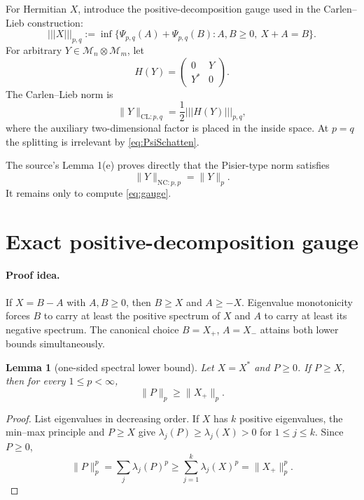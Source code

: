 \documentclass[11pt]{article}
\newtheorem{lemma}{Lemma}
\newcommand{\M}{\mathcal M}
\newcommand{\CL}{\mathrm{CL}}
\newcommand{\NC}{\mathrm{NC}}
\begin{document}
For Hermitian $X$, introduce the positive-decomposition gauge used in the
Carlen--Lieb construction:
\begin{equation}\label{eq:gauge}
 |||X|||_{p,q}:=
 \inf\{\Psi_{p,q}(A)+\Psi_{p,q}(B):
       A,B\ge0,\ X+A=B\}.
\end{equation}
For arbitrary $Y\in\M_n\otimes\M_m$, let
\[
 H(Y)=\begin{pmatrix}0&Y\\Y^*&0\end{pmatrix}.
\]
The Carlen--Lieb norm is
\begin{equation}\label{eq:CLdef}
 \|Y\|_{\CL:p,q}=\frac12|||H(Y)|||_{p,q},
\end{equation}
where the auxiliary two-dimensional factor is placed in the inside space.
At $p=q$ the splitting is irrelevant by \eqref{eq:PsiSchatten}.

The source's Lemma 1(e) proves directly that the Pisier-type norm satisfies
\begin{equation}\label{eq:NCsource}
 \|Y\|_{\NC:p,p}=\|Y\|_p.
\end{equation}
It remains only to compute \eqref{eq:gauge}.

\section{Exact positive-decomposition gauge}

\paragraph{Proof idea.}
If $X=B-A$ with $A,B\ge0$, then $B\ge X$ and $A\ge-X$.  Eigenvalue
monotonicity forces $B$ to carry at least the positive spectrum of $X$ and
$A$ to carry at least its negative spectrum.  The canonical choice
$B=X_+$, $A=X_-$ attains both lower bounds simultaneously.

\begin{lemma}[one-sided spectral lower bound]\label{lem:one-sided}
Let $X=X^*$ and $P\ge0$.  If $P\ge X$, then for every $1\le p<\infty$,
\[
 \|P\|_p\ge\|X_+\|_p.
\]
\end{lemma}

\begin{proof}
List eigenvalues in decreasing order.  If $X$ has $k$ positive eigenvalues,
the min--max principle and $P\ge X$ give
$\lambda_j(P)\ge\lambda_j(X)>0$ for $1\le j\le k$.  Since $P\ge0$,
\[
 \|P\|_p^p=\sum_j\lambda_j(P)^p
 \ge\sum_{j=1}^k\lambda_j(X)^p=\|X_+\|_p^p.
\]
\end{proof}
\end{document}
